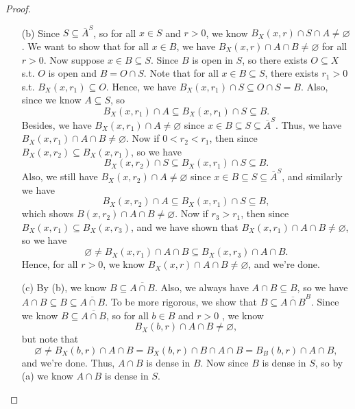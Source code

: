 \begin{proof}
\begin{itemize}
    \item [(b)] Since \(S \subseteq \overline{A}^S \), so for all \(x \in S\) and \(r > 0\), we know \(B_X(x, r) \cap S \cap A \neq \varnothing \). We want to show that for all \(x \in B\), we have \(B_X(x, r) \cap A \cap B \neq \varnothing \) for all \(r > 0\). Now suppose \(x \in B \subseteq S\).  Since \(B\) is open in \(S\), so there exists \(O \subseteq X\) s.t. \(O\) is open and \(B = O \cap S\). Note that for all \(x \in B \subseteq S\), there exists \(r_1 > 0 \) s.t. \(B_X(x, r_1) \subseteq O\). Hence, we have \(B_X(x, r_1) \cap S \subseteq O \cap S = B\). Also, since we know \(A \subseteq S\), so 
    \[
      B_X(x, r_1) \cap A \subseteq B_X(x, r_1) \cap S \subseteq B.
    \]Besides, we have \(B_X(x, r_1) \cap A \neq \varnothing \) since \(x \in B \subseteq S \subseteq \overline{A}^S \). Thus, we have \(B_X(x, r_1) \cap A \cap B \neq \varnothing \). Now if \(0 < r_2 < r_1\), then since \(B_X(x, r_2) \subseteq B_X(x, r_1)\), so we have 
    \[
      B_X(x ,r_2) \cap S \subseteq B_X(x, r_1) \cap S \subseteq B.
    \] Also, we still have \(B_X(x, r_2) \cap A \neq \varnothing\) since \(x \in B \subseteq S \subseteq \overline{A}^S \), and similarly we have 
    \[
      B_X(x, r_2) \cap A \subseteq B_X(x, r_1) \cap S \subseteq B,
    \] which shows \(B(x, r_2) \cap A \cap B \neq \varnothing \). Now if \(r_3 > r_1\), then since \(B_X(x, r_1) \subseteq B_X(x, r_3)\), and we have shown that \(B_X(x, r_1) \cap A \cap B \neq \varnothing \), so we have 
    \[
      \varnothing \neq B_X(x, r_1) \cap A \cap B \subseteq B_X(x, r_3) \cap A \cap B.
    \]    Hence, for all \(r > 0\), we know \(B_X(x, r) \cap A \cap B \neq \varnothing \), and we're done.  
    \item [(c)] By (b), we know \(B \subseteq \overline{A \cap B} \). Also, we always have \(A \cap B \subseteq B\), so we have \(A \cap B \subseteq B \subseteq \overline{A \cap B} \). To be more rigorous, we show that \(B \subseteq \overline{A \cap B}^B \). Since we know \(B \subseteq \overline{A \cap B} \), so for all \(b \in B\) and \(r > 0\) , we know
    \[
      B_X(b, r) \cap A \cap B \neq \varnothing,
    \]
    but note that 
    \[
      \varnothing \neq B_X(b, r) \cap A \cap B = B_X(b, r) \cap B \cap A \cap B = B_B(b, r) \cap A \cap B,
    \] and we're done.
    Thus, \(A \cap B\) is dense in \(B\). Now since \(B\) is dense in \(S\), so by (a) we know \(A \cap B\) is dense in \(S\).       
  \end{itemize}
\end{proof}
